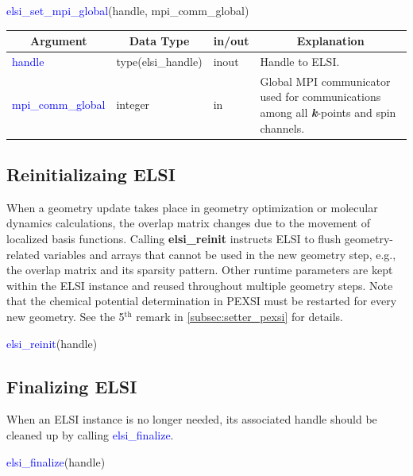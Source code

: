 \documentclass{report}
\begin{document}
\begin{labeling}{\hspace{6cm}}
\item [\hspace{0.3cm} \textcolor{blue}{elsi\_set\_mpi\_global}(handle, mpi\_comm\_global)]
\end{labeling}

\begin{tabular}[]{|p{30mm}|p{30mm}|p{15mm}|p{90mm}|}
\hline
\multicolumn{1}{|c|}{\textbf{Argument}} & \multicolumn{1}{c|}{\textbf{Data Type}} & \multicolumn{1}{c|}{\textbf{in/out}} & \multicolumn{1}{c|}{\textbf{Explanation}}\\
\hline
\textcolor{blue}{handle}            & type(elsi\_handle) & inout & Handle to ELSI.\\
\hline
\textcolor{blue}{mpi\_comm\_global} & integer            & in    & Global MPI communicator used for communications among all \textbf{\textit{k}}-points and spin channels.\\
\hline
\end{tabular}

\subsection{Reinitializaing ELSI}
\label{subsec:setup_reinit}
When a geometry update takes place in geometry optimization or molecular dynamics calculations, the overlap matrix changes due to the movement of localized basis functions. Calling \textbf{elsi\_reinit} instructs ELSI to flush geometry-related variables and arrays that cannot be used in the new geometry step, e.g., the overlap matrix and its sparsity pattern. Other runtime parameters are kept within the ELSI instance and reused throughout multiple geometry steps. Note that the chemical potential determination in PEXSI must be restarted for every new geometry. See the 5$^\text{th}$ remark in \ref{subsec:setter_pexsi} for details.
\begin{labeling}{\hspace{6cm}}
\item [\hspace{0.3cm} \textcolor{blue}{elsi\_reinit}(handle)]
\end{labeling}

\subsection{Finalizing ELSI}
\label{subsec:setup_final}
When an ELSI instance is no longer needed, its associated handle should be cleaned up by calling \textcolor{blue}{elsi\_finalize}.
\begin{labeling}{\hspace{6cm}}
\item [\hspace{0.3cm} \textcolor{blue}{elsi\_finalize}(handle)]
\end{labeling}
\end{document}

